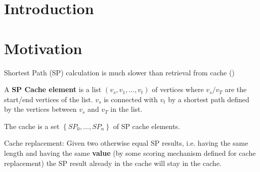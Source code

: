 \section{Introduction} \label{sec:intro}
%
%
%
%
%
%
\section{Motivation}
Shortest Path (SP) calculation is much slower than retrieval from cache ()


\begin{deff}
A \textbf{SP Cache element} is a list $\left(v_s,v_{1},...,v_t\right)$ of vertices where $v_s/v_T$ are the start/end vertices of the list. $v_s$ is connected with $v_t$ by a shortest path defined by the vertices between $v_s$ and $v_T$ in the list.
\end{deff}

The cache is a set $\left\{SP_0,...,SP_n\right\}$ of SP cache elements. 

\begin{deff}
Cache replacement: Given two otherwise equal SP results, i.e. having the same length and having the same \textbf{value} (by some scoring mechanism defined for cache replacement) the SP result already in the cache will stay in the cache.
\end{deff}



